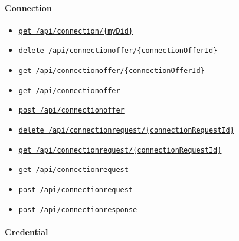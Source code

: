 \hypertarget{connection}{%
\paragraph{\texorpdfstring{\protect\hyperlink{Connection}{Connection}}{Connection}}\label{connection}}

\begin{itemize}
\tightlist
\item
  \protect\hyperlink{apiConnectionMyDidGet}{\texttt{get\ /api/connection/\{myDid\}}}
\item
  \protect\hyperlink{apiConnectionofferConnectionOfferIdDelete}{\texttt{delete\ /api/connectionoffer/\{connectionOfferId\}}}
\item
  \protect\hyperlink{apiConnectionofferConnectionOfferIdGet}{\texttt{get\ /api/connectionoffer/\{connectionOfferId\}}}
\item
  \protect\hyperlink{apiConnectionofferGet}{\texttt{get\ /api/connectionoffer}}
\item
  \protect\hyperlink{apiConnectionofferPost}{\texttt{post\ /api/connectionoffer}}
\item
  \protect\hyperlink{apiConnectionrequestConnectionRequestIdDelete}{\texttt{delete\ /api/connectionrequest/\{connectionRequestId\}}}
\item
  \protect\hyperlink{apiConnectionrequestConnectionRequestIdGet}{\texttt{get\ /api/connectionrequest/\{connectionRequestId\}}}
\item
  \protect\hyperlink{apiConnectionrequestGet}{\texttt{get\ /api/connectionrequest}}
\item
  \protect\hyperlink{apiConnectionrequestPost}{\texttt{post\ /api/connectionrequest}}
\item
  \protect\hyperlink{apiConnectionresponsePost}{\texttt{post\ /api/connectionresponse}}
\end{itemize}

\hypertarget{credential}{%
\paragraph{\texorpdfstring{\protect\hyperlink{Credential}{Credential}}{Credential}}\label{credential}}


